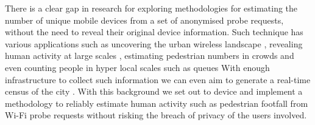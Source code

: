 There is a clear gap in research for exploring methodologies for estimating the
number of unique mobile devices from a set of anonymised probe requests, without
the need to reveal their original device information. Such technique has
various applications such as uncovering the urban wireless landscape
\citep{rose2010mapping}, revealing human activity at large scales
\citep{qin2013discovering}, estimating pedestrian numbers in crowds
\citep{schauer2014estimating,fukuzaki2015statistical} and even counting people
in hyper local scales such as queues \citep{wang2013measuring} With enough
infrastructure to collect such information we can even aim to generate a
real-time census of the city \citep{konto2017}. With this background we set out
to device and implement a methodology to reliably estimate human activity such
as pedestrian footfall from Wi-Fi probe requests without risking the breach of
privacy of the users involved.
